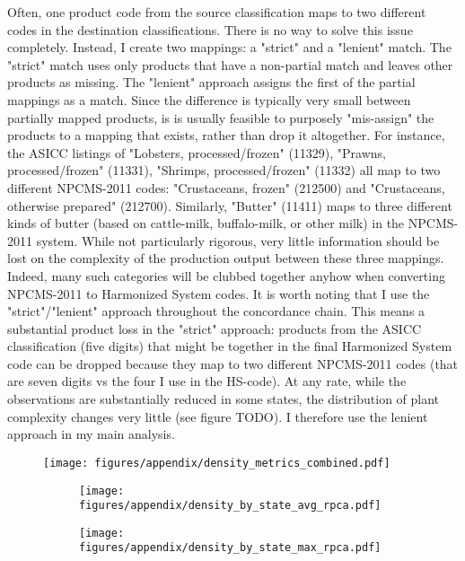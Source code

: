 Often, one product code from the source classification maps to two different codes in the destination classifications. There is no way to solve this issue completely. Instead, I create two mappings: a "strict" and a "lenient" match. The "strict" match uses only products that have a non-partial match and leaves other products as missing. The "lenient" approach assigns the first of the partial mappings as a match. Since the difference is typically very small between partially mapped products, is is usually feasible to purposely "mis-assign" the products to a mapping that exists, rather than drop it altogether. For instance, the ASICC listings of "Lobsters, processed/frozen" (11329), "Prawns, processed/frozen" (11331), "Shrimps, processed/frozen" (11332) all map to two different NPCMS-2011 codes: "Crustaceans, frozen" (212500) and "Crustaceans, otherwise prepared" (212700). Similarly, "Butter" (11411) maps to three different kinds of butter (based on cattle-milk, buffalo-milk, or other milk) in the NPCMS-2011 system. While not particularly rigorous, very little information should be lost on the complexity of the production output between these three mappings. Indeed, many such categories will be clubbed together anyhow when converting NPCMS-2011 to Harmonized System codes. It is worth noting that I use the "strict"/"lenient" approach throughout the concordance chain. This means a substantial product loss in the "strict" approach: products from the ASICC classification (five digits) that might be together in the final Harmonized System code can be dropped because they map to two different NPCMS-2011 codes (that are seven digits vs the four I use in the HS-code). At any rate, while the observations are substantially reduced in some states, the distribution of plant complexity changes very little (see figure TODO). I therefore use the lenient approach in my main analysis.


\begin{figure}[htpb]
	\centering
	\texttt{[image: figures/appendix/density\_metrics\_combined.pdf]}
	\caption{}%
	\label{fig:}
\end{figure}

\begin{figure}
     \centering
     \begin{subfigure}[b]{0.45\textwidth}
         \centering
         \texttt{[image: figures/appendix/density\_by\_state\_avg\_rpca.pdf]}
	 \caption{}
         \label{fig:}
     \end{subfigure}
     \hfill
     \begin{subfigure}[b]{0.45\textwidth}
         \centering
         \texttt{[image: figures/appendix/density\_by\_state\_max\_rpca.pdf]}
	 \caption{}
         \label{fig:interaction_sample_max}
     \end{subfigure}
     \caption[]{}
        \label{fig:}
\end{figure}

